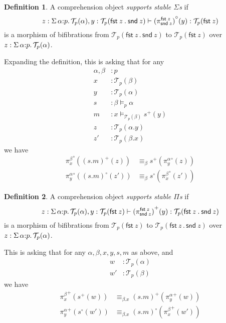 \documentclass[10pt]{article}
\theoremstyle{definition}
\newtheorem{definition}{Definition}
\newcommand\dsd[1]{\ensuremath{\mathsf{#1}}}
\newcommand{\Yields}{\vDash}
\newcommand\TrPlus[2]{\ensuremath{{#1}^+(#2)}}
\newcommand\TrCirc[2]{\ensuremath{{#1}^\circ(#2)}}
\newcommand\var[1]{\ensuremath{\mathsf{var}_{#1}}}
\newcommand\El[2]{\mathcal{T}_{#1}(#2)}
\newcommand\ApEl[2]{\mathcal{T}_{#1}\langle#2\rangle}
\newcommand{\app}[2]{\ensuremath{#1 \: #2}}
\newcommand{\sigmacl}[3]{\ensuremath{\textnormal{$\Sigma$}\,#1{:}#2.\,#3}}
\newcommand{\fst}[1]{\app{\dsd{fst}}{#1}}
\newcommand{\snd}[1]{\app{\dsd{snd}}{#1}}
\newcommand\bdot[0]{\mathbin{.}}
\begin{document}
\begin{definition}
  A comprehension object \emph{supports stable $\Sigma$s} if
\[
  z:\sigmacl{\alpha}{p}{\El{p}{\alpha}}, y : \El{p}{\fst z \bdot \snd z}
  \vdash \TrCirc{(\pi^{\fst z}_{\snd{z}})}{y} : \El{p}{\fst z} 
\]
is a morphism of bifibrations from $\El{p}{\fst z \bdot \snd z}$ to $\El{p}{\fst z}$ over $z : \sigmacl{\alpha}{p}{\El{p}{\alpha}}$.
\end{definition}
Expanding the definition, this is asking that for any 
\begin{align*}
\alpha, \beta &: p \\
x &: \El{p}{\beta} \\
y &: \El{p}{\alpha} \\
s &: \beta\Yields_p \alpha \\
m &: x \Yields_{\El{p}{\beta}} \TrPlus{s}{y} \\
z &: \El{p}{\alpha.y} \\
z' &: \El{p}{\beta.x}
\end{align*}
we have
\begin{align*}
\TrCirc{\pi^{\beta}_x}{\TrPlus{(s . m)}{z}} &\equiv_\beta \TrPlus{s}{\TrCirc{\pi^{\alpha}_{y}}{z}} \\
\TrCirc{\pi^{\alpha}_y}{\TrCirc{(s . m)}{z'}} &\equiv_\beta \TrCirc{s}{\TrCirc{\pi^{\beta}_{x}}{z'}}
\end{align*}

\begin{definition}
  A comprehension object \emph{supports stable $\Pi$s} if
\[
  z:\sigmacl{\alpha}{p}{\El{p}{\alpha}}, y : \El{p}{\fst z}
  \vdash \TrPlus{(\pi^{\fst z}_{\snd{z}})}{y} : \El{p}{\fst z \bdot \snd z} 
\]
is a morphism of bifibrations from $\El{p}{\fst z}$ to $\El{p}{\fst z \bdot \snd z}$ over $z : \sigmacl{\alpha}{p}{\El{p}{\alpha}}$.
\end{definition}
This is asking that for any $\alpha, \beta, x, y, s, m$ as above, and
\begin{align*}
w &: \El{p}{\alpha} \\
w' &: \El{p}{\beta}
\end{align*}
we have
\begin{align*}
\TrPlus{\pi^{\beta}_x}{\TrPlus{s}{w}} &\equiv_{\beta.x} \TrPlus{(s . m)}{\TrPlus{\pi^{\alpha}_{y}}{w}} \\
\TrPlus{\pi^{\alpha}_y}{\TrCirc{s}{w'}} &\equiv_{\beta.x} \TrCirc{(s . m)}{\TrPlus{\pi^{\beta}_{x}}{w'}}
\end{align*}

\end{document}
